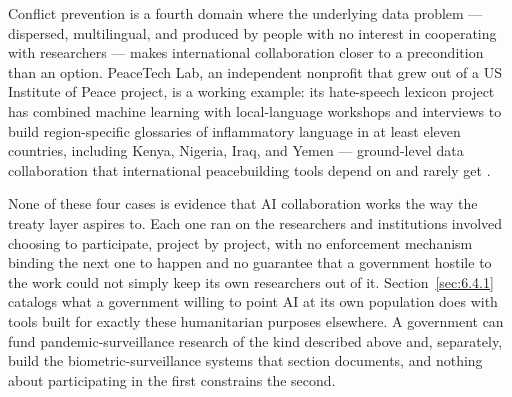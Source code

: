 Conflict prevention is a fourth domain where the underlying data problem — dispersed, multilingual, and produced by people with no interest in cooperating with researchers — makes international collaboration closer to a precondition than an option. PeaceTech Lab, an independent nonprofit that grew out of a US Institute of Peace project, is a working example: its hate-speech lexicon project has combined machine learning with local-language workshops and interviews to build region-specific glossaries of inflammatory language in at least eleven countries, including Kenya, Nigeria, Iraq, and Yemen — ground-level data collaboration that international peacebuilding tools depend on and rarely get \autocite{peacetechlab2019monitoring}.

None of these four cases is evidence that AI collaboration works the way the treaty layer aspires to. Each one ran on the researchers and institutions involved choosing to participate, project by project, with no enforcement mechanism binding the next one to happen and no guarantee that a government hostile to the work could not simply keep its own researchers out of it. Section~\ref{sec:6.4.1} catalogs what a government willing to point AI at its own population does with tools built for exactly these humanitarian purposes elsewhere. A government can fund pandemic-surveillance research of the kind described above and, separately, build the biometric-surveillance systems that section documents, and nothing about participating in the first constrains the second.
